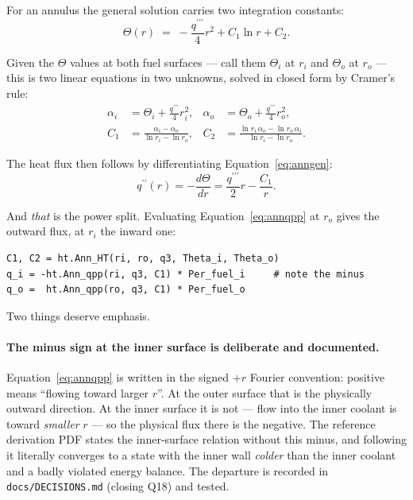 \documentclass[11pt]{article}
\newcommand{\code}[1]{\texttt{#1}}
\newcommand{\qpp}{q^{\prime\prime}}
\newcommand{\qppp}{q^{\prime\prime\prime}}
\begin{document}
For an annulus the general solution carries two integration constants:
\begin{equation}
\Theta(r) \;=\; -\frac{\qppp}{4}r^2 + C_1 \ln r + C_2.
\label{eq:anngen}
\end{equation}

Given the $\Theta$ values at both fuel surfaces --- call them $\Theta_i$ at $r_i$ and
$\Theta_o$ at $r_o$ --- this is two linear equations in two unknowns, solved in closed
form by Cramer's rule:
\begin{align}
\alpha_i &= \Theta_i + \tfrac{\qppp}{4}r_i^2, &
\alpha_o &= \Theta_o + \tfrac{\qppp}{4}r_o^2, \\[2pt]
C_1 &= \frac{\alpha_i - \alpha_o}{\ln r_i - \ln r_o}, &
C_2 &= \frac{\ln r_i\,\alpha_o - \ln r_o\,\alpha_i}{\ln r_i - \ln r_o}.
\end{align}

The heat flux then follows by differentiating Equation~\eqref{eq:anngen}:
\begin{equation}
\qpp(r) = -\frac{d\Theta}{dr} = \frac{\qppp}{2}r - \frac{C_1}{r}.
\label{eq:annqpp}
\end{equation}

And \emph{that} is the power split. Evaluating Equation~\eqref{eq:annqpp} at $r_o$ gives
the outward flux, at $r_i$ the inward one:
\begin{lstlisting}
C1, C2 = ht.Ann_HT(ri, ro, q3, Theta_i, Theta_o)
q_i = -ht.Ann_qpp(ri, q3, C1) * Per_fuel_i     # note the minus
q_o =  ht.Ann_qpp(ro, q3, C1) * Per_fuel_o
\end{lstlisting}

Two things deserve emphasis.

\paragraph{The minus sign at the inner surface is deliberate and documented.}
Equation~\eqref{eq:annqpp} is written in the signed $+r$ Fourier convention: positive
means ``flowing toward larger $r$''. At the outer surface that is the physically outward
direction. At the inner surface it is not --- flow into the inner coolant is toward
\emph{smaller} $r$ --- so the physical flux there is the negative. The reference
derivation PDF states the inner-surface relation without this minus, and following it
literally converges to a state with the inner wall \emph{colder} than the inner coolant
and a badly violated energy balance. The departure is recorded in
\code{docs/DECISIONS.md} (closing Q18) and tested.
\end{document}
